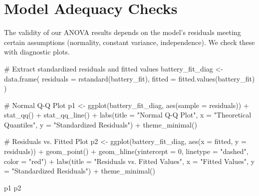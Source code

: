 \documentclass[
  letterpaper,
]{scrbook}
\newenvironment{Shaded}{\begin{snugshade}}{\end{snugshade}}
\newcommand{\AttributeTok}[1]{\textcolor[rgb]{0.40,0.45,0.13}{#1}}
\newcommand{\CommentTok}[1]{\textcolor[rgb]{0.37,0.37,0.37}{#1}}
\newcommand{\DecValTok}[1]{\textcolor[rgb]{0.68,0.00,0.00}{#1}}
\newcommand{\FunctionTok}[1]{\textcolor[rgb]{0.28,0.35,0.67}{#1}}
\newcommand{\NormalTok}[1]{\textcolor[rgb]{0.00,0.23,0.31}{#1}}
\newcommand{\OtherTok}[1]{\textcolor[rgb]{0.00,0.23,0.31}{#1}}
\newcommand{\SpecialCharTok}[1]{\textcolor[rgb]{0.37,0.37,0.37}{#1}}
\newcommand{\StringTok}[1]{\textcolor[rgb]{0.13,0.47,0.30}{#1}}
\begin{document}
\section{Model Adequacy Checks}\label{model-adequacy-checks-1}

The validity of our ANOVA results depends on the model's residuals
meeting certain assumptions (normality, constant variance,
independence). We check these with diagnostic plots.

\begin{Shaded}
\begin{Highlighting}[]
\CommentTok{\# Extract standardized residuals and fitted values}
\NormalTok{battery\_fit\_diag }\OtherTok{\textless{}{-}} \FunctionTok{data.frame}\NormalTok{(}
  \AttributeTok{residuals =} \FunctionTok{rstandard}\NormalTok{(battery\_fit),}
  \AttributeTok{fitted =} \FunctionTok{fitted.values}\NormalTok{(battery\_fit)}
\NormalTok{)}

\CommentTok{\# Normal Q{-}Q Plot}
\NormalTok{p1 }\OtherTok{\textless{}{-}} \FunctionTok{ggplot}\NormalTok{(battery\_fit\_diag, }\FunctionTok{aes}\NormalTok{(}\AttributeTok{sample =}\NormalTok{ residuals)) }\SpecialCharTok{+}
  \FunctionTok{stat\_qq}\NormalTok{() }\SpecialCharTok{+}
  \FunctionTok{stat\_qq\_line}\NormalTok{() }\SpecialCharTok{+}
  \FunctionTok{labs}\NormalTok{(}\AttributeTok{title =} \StringTok{"Normal Q{-}Q Plot"}\NormalTok{, }\AttributeTok{x =} \StringTok{"Theoretical Quantiles"}\NormalTok{, }\AttributeTok{y =} \StringTok{"Standardized Residuals"}\NormalTok{) }\SpecialCharTok{+}
  \FunctionTok{theme\_minimal}\NormalTok{()}

\CommentTok{\# Residuals vs. Fitted Plot}
\NormalTok{p2 }\OtherTok{\textless{}{-}} \FunctionTok{ggplot}\NormalTok{(battery\_fit\_diag, }\FunctionTok{aes}\NormalTok{(}\AttributeTok{x =}\NormalTok{ fitted, }\AttributeTok{y =}\NormalTok{ residuals)) }\SpecialCharTok{+}
  \FunctionTok{geom\_point}\NormalTok{() }\SpecialCharTok{+}
  \FunctionTok{geom\_hline}\NormalTok{(}\AttributeTok{yintercept =} \DecValTok{0}\NormalTok{, }\AttributeTok{linetype =} \StringTok{"dashed"}\NormalTok{, }\AttributeTok{color =} \StringTok{"red"}\NormalTok{) }\SpecialCharTok{+}
  \FunctionTok{labs}\NormalTok{(}\AttributeTok{title =} \StringTok{"Residuals vs. Fitted Values"}\NormalTok{, }\AttributeTok{x =} \StringTok{"Fitted Values"}\NormalTok{, }\AttributeTok{y =} \StringTok{"Standardized Residuals"}\NormalTok{) }\SpecialCharTok{+}
  \FunctionTok{theme\_minimal}\NormalTok{()}

\NormalTok{p1 }
\NormalTok{p2}
\end{Highlighting}
\end{Shaded}
\end{document}
